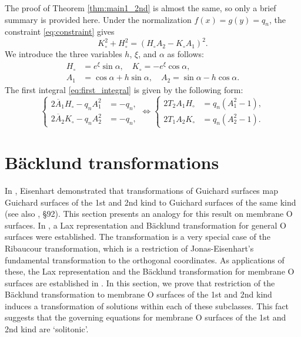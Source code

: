 \documentclass[a4paper]{amsart}
\theoremstyle{definition}
\begin{document}
%
The proof of Theorem \ref{thm:main1_2nd} is almost the same, so only a brief summary is provided here.
Under the normalization $f(x) = g(y) = q_n$, the constraint \eqref{eq:constraint} gives
\begin{equation}
K_\circ^2 + H_\circ^2 = (H_\circ A_2 - K_\circ A_1)^2.
\end{equation}
We introduce the three variables $h$, $\xi$, and $\alpha$ as follows:
\begin{equation}
\begin{aligned}
H_\circ &= e^\xi \sin \alpha, \quad
K_\circ = - e^\xi \cos \alpha,\\
A_1 &= \cos \alpha + h \sin \alpha, \quad
A_2 = \sin \alpha - h \cos \alpha.
\end{aligned}
\end{equation}
The first integral \eqref{eq:first_integral} is given by the following form:
\begin{equation}
\left\{
\begin{aligned}
2\overline{A}_1 H_\circ - q_n A_1^2 &= -q_n,\\
2\overline{A}_2 K_\circ - q_n A_2^2 &= -q_n,
\end{aligned}
\right.
\iff
\left\{
\begin{aligned}
2T_2 A_1 H_\circ &= q_n (A_1^2 - 1),\\
2T_1 A_2 K_\circ &= q_n (A_2^2 - 1).
\end{aligned}
\right.
\end{equation}

\section{B\"acklund transformations}
\label{sec:Backlund}

In \cite{Eisenhart_Omega2}, Eisenhart demonstrated that transformations of Guichard surfaces map Guichard surfaces of the 1st and 2nd kind to Guichard surfaces of the same kind (see also \cite{eisenhart_transformation}, \S 92).
This section presents an analogy for this result on membrane O surfaces.
In \cite{schief_unification_2003}, a Lax representation and B\"acklund transformation for general O surfaces were established.
The transformation is a very special case of the Ribaucour transformation, which is a restriction of Jonas-Eisenhart's fundamental transformation to the orthogonal coordinates.
As applications of these, the Lax representation and the B\"acklund transformation for membrane O surfaces are established in \cite{RogersSchief}.
In this section, we prove that restriction of the B\"acklund transformation to membrane O surfaces of the 1st and 2nd kind induces a transformation of solutions within each of these subclasses.
This fact suggests that the governing equations for membrane O surfaces of the 1st and 2nd kind are `solitonic'.
\end{document}
